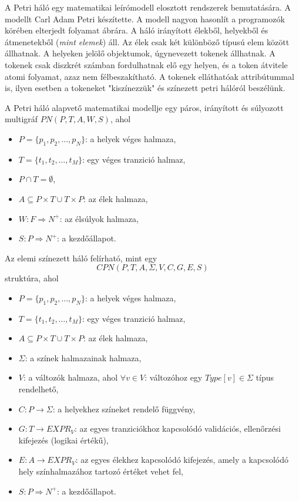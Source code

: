 

A Petri háló egy matematikai leírómodell elosztott rendszerek bemutatására.
A modellt Carl Adam Petri készítette.
A modell nagyon hasonlít a programozók körében elterjedt folyamat ábrára.
A háló irányított élekből, helyekből és átmenetekből (\textsl{mint elemek}) áll.
Az élek csak két különböző típusú elem között állhatnak.
A helyeken jelölő objektumok, úgynevezett tokenek állhatnak.
A tokenek csak diszkrét számban fordulhatnak elő egy helyen, és a token átvitele atomi folyamat, azaz nem félbeszakítható.
A tokenek elláthatóak attribútummal is, ilyen esetben a tokeneket "kiszínezzük" és színezett petri hálóról beszélünk. %

A Petri háló alapvető matematikai modellje egy páros, irányított és súlyozott multigráf $PN(P,T,A,W,S)$, ahol 
\begin{itemize}
\item $P=\{ p_1,p_2,\ldots ,p_N \}$: a helyek véges halmaza,
\item $T=\{ t_1,t_2,\ldots ,t_M\}$: egy véges tranzició halmaz,
\item $P\cap T = \emptyset$,
\item $A \subseteq P\times T \cup T\times P$: az élek halmaza,
\item $W: F\Rightarrow N^+$: az élsúlyok halmaza,
\item $S: P\Rightarrow N^+$: a kezdőállapot.
\end{itemize}


Az elemi színezett háló felírható, mint egy
\[
CPN(P, T, A, \Sigma, V, C, G, E, S)
\]
struktúra, ahol 
\begin{itemize}
\item $P=\{ p_1, p_2, \ldots, p_N \}$: a helyek véges halmaza,
\item $T=\{ t_1, t_2, \ldots, t_M\}$: egy véges tranzició halmaz,
\item $A \subseteq P\times T \cup T \times P$: az élek halmaza,
\item $\Sigma$: a színek halmazainak halmaza, 
\item $V$: a változók halmaza, ahol $\forall v\in V$: változóhoz egy $Type[v] \in \Sigma $ típus rendelhető,
\item $C: P\rightarrow \Sigma$: a helyekhez színeket rendelő függvény,
\item $G: T\rightarrow EXPR_V$: az egyes tranziciókhoz kapcsolódó validációs, ellenőrzési kifejezés (logikai értékű),
\item $E: A\rightarrow EXPR_V$: az egyes élekhez kapcsolódó kifejezés, amely a kapcsolódó hely színhalmazához tartozó értéket vehet fel,
\item $S: P\Rightarrow N^+$: a kezdőállapot.
\end{itemize}


